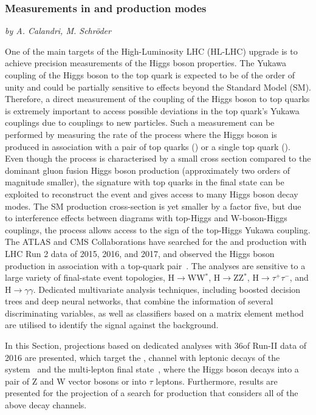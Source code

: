 \subsubsection{Measurements in \ttH and \tH production modes}
\begin{center}{\it by A. Calandri, M. Schr\"oder} \end{center}

One of the main targets of the High-Luminosity LHC (HL-LHC) upgrade is to achieve precision measurements of the Higgs boson properties.
The Yukawa coupling of the Higgs boson to the top quark is expected to be of the order of unity and could be partially sensitive to effects beyond the Standard Model (SM).
Therefore, a direct measurement of the coupling of the Higgs boson to top quarks is extremely important to access possible deviations in the top quark's Yukawa couplings due to couplings to new particles.
Such a measurement can be performed by measuring the rate of the process where the Higgs boson is produced in association with a pair of top quarks (\ttH) or a single top quark (\tH).
Even though the \ttH process is characterised by a small cross section compared to the dominant gluon fusion Higgs boson production (approximately two orders of magnitude smaller), the signature with top quarks in the final state can be exploited to reconstruct the event and gives access to many Higgs boson decay modes.
The SM \tH production cross-section is yet smaller by a factor five, but due to interference effects between diagrams with top-Higgs and W-boson-Higgs couplings, the process allows access to the sign of the top-Higgs Yukawa coupling.
The ATLAS and CMS Collaborations have searched for the \ttH and \tH production with LHC Run 2 data of 2015, 2016, and 2017, and observed the Higgs boson production in association with a top-quark pair~\cite{Aaboud:2018urx,Sirunyan:2018hoz}.
The analyses are sensitive to a large variety of final-state event topologies, H$\rightarrow$WW$^{*}$, H$\rightarrow$ZZ$^{*}$, H$\rightarrow \tau^{+}\tau^{-}$, \Htobb and H$\rightarrow \gamma\gamma$.
Dedicated multivariate analysis techniques, including boosted decision trees and deep neural networks, that combine the information of several discriminating variables, as well as classifiers based on a matrix element method are utilised to identify the signal against the background.

In this Section, projections based on dedicated analyses with 36\Uifb of Run-II data of 2016 are presented, which target the \ttH, \Htobb channel with leptonic decays of the \ttbar system~\cite{Aaboud:2017rss,Sirunyan:2018mvw} and the \ttH multi-lepton final state~\cite{Aaboud:2017jvq}, where the Higgs boson decays into a pair of Z and W vector bosons or into $\tau$ leptons.
Furthermore, results are presented for the projection of a search for \tH production that considers all of the above decay channels.


